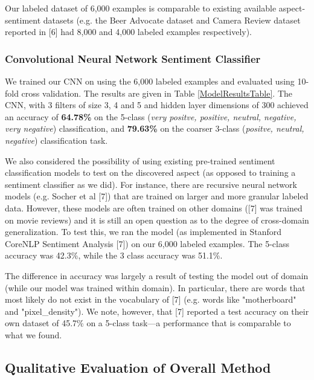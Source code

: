 \documentclass{article} %
\begin{document}
Our labeled dataset of 6,000 examples is comparable to existing available aspect-sentiment datasets (e.g. the Beer Advocate dataset and Camera Review dataset reported in [6] had 8,000 and 4,000 labeled examples respectively).


\subsubsection{Convolutional Neural Network Sentiment Classifier}
We trained our CNN on using the 6,000 labeled examples and evaluated using 10-fold cross validation. The results are given in Table \ref{ModelResultsTable}. The CNN, with 3 filters of size 3, 4 and 5 and hidden layer dimensions of 300 achieved an accuracy of \textbf{64.78\%} on the 5-class (\textit{very positve, positive, neutral, negative, very negative}) classification, and \textbf{79.63\%} on the coarser 3-class (\textit{positve, neutral, negative}) classification task.

We also considered the possibility of using existing pre-trained sentiment classification models to test on the discovered aspect (as opposed to training a sentiment classifier as we did). For instance, there are recursive neural network models (e.g. Socher et al [7]) that are trained on larger and more granular labeled data. However, these models are often trained on other domains ([7] was trained on movie reviews) and it is still an open question as to the degree of cross-domain generalization. To test this, we ran the model (as implemented in Stanford CoreNLP Sentiment Analysis [7]) on our 6,000 labeled examples. The 5-class accuracy was 42.3\%, while the 3 class accuracy was 51.1\%.

The difference in accuracy was largely a result of testing the model out of domain (while our model was trained within domain). In particular, there are words that most likely do not exist in the vocabulary of [7] (e.g. words like "motherboard" and "pixel\_density"). We note, however, that [7] reported a test accuracy on their own dataset of 45.7\% on a 5-class task---a performance that is comparable to what we found.

\subsection{Qualitative Evaluation of Overall Method}
\end{document}
